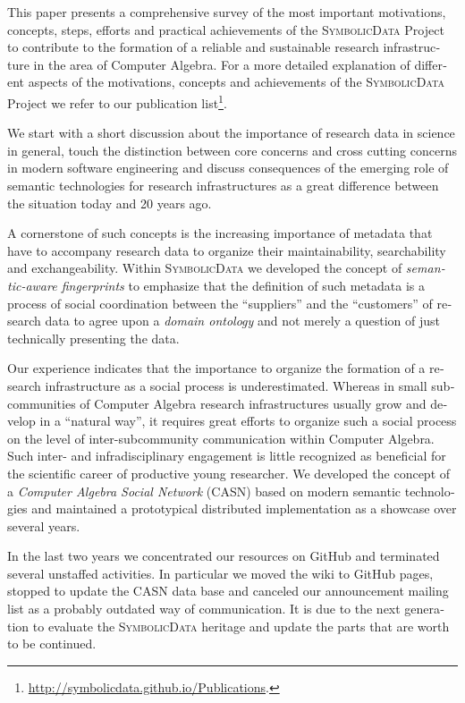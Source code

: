 \documentclass[11pt]{article}
\def\SD{\textsc{SymbolicData}}
\begin{document}
\begin{otherlanguage}{english}
\begin{multicols}{2}
This paper presents a comprehensive survey of the most important motivations,
concepts, steps, efforts and practical achievements of the {\SD} Project to
contribute to the formation of a reliable and sustainable research
infrastructure in the area of Computer Algebra.  For a more detailed
explanation of different aspects of the motivations, concepts and achievements
of the {\SD} Project we refer to our publication
list\footnote{\url{http://symbolicdata.github.io/Publications}.}.

We start with a short discussion about the importance of research data in
science in general, touch the distinction between core concerns and cross
cutting concerns in modern software engineering and discuss consequences of the
emerging role of semantic technologies for research infrastructures as a great
difference between the situation today and 20 years ago.

A cornerstone of such concepts is the increasing importance of metadata that
have to accompany research data to organize their maintainability,
searchability and exchangeability. Within {\SD} we developed the concept of
\emph{semantic-aware fingerprints} to emphasize that the definition of such
metadata is a process of social coordination between the ``suppliers'' and the
``customers'' of research data to agree upon a \emph{domain ontology} and not
merely a question of just technically presenting the data.

Our experience indicates that the importance to organize the formation of a
research infrastructure as a social process is underestimated.  Whereas in
small subcommunities of Computer Algebra research infrastructures usually grow
and develop in a ``natural way'', it requires great efforts to organize such a
social process on the level of inter-subcommunity communication within Computer
Algebra.  Such inter- and infradisciplinary engagement is little recognized as
beneficial for the scientific career of productive young researcher. We
developed the concept of a \emph{Computer Algebra Social Network} (CASN)
\cite{cicm-14} based on modern semantic technologies and maintained a
prototypical distributed implementation as a showcase over several years.

In the last two years we concentrated our resources on GitHub and terminated
several unstaffed activities. In particular we moved the wiki to GitHub pages,
stopped to update the CASN data base and canceled our announcement mailing
list as a probably outdated way of communication.  It is due to the next
generation to evaluate the {\SD} heritage and update the parts that are worth
to be continued.


\end{multicols}
\end{otherlanguage}
\end{document}

